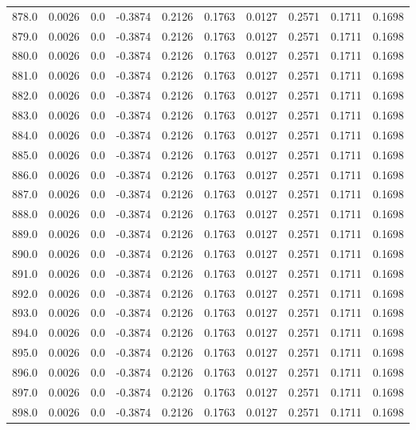 \begin{longtable}{lrrrrrrrrr}
878.0 & 0.0026 & 0.0 & -0.3874 & 0.2126 & 0.1763 & 0.0127 & 0.2571 & 0.1711 & 0.1698 \\
879.0 & 0.0026 & 0.0 & -0.3874 & 0.2126 & 0.1763 & 0.0127 & 0.2571 & 0.1711 & 0.1698 \\
880.0 & 0.0026 & 0.0 & -0.3874 & 0.2126 & 0.1763 & 0.0127 & 0.2571 & 0.1711 & 0.1698 \\
881.0 & 0.0026 & 0.0 & -0.3874 & 0.2126 & 0.1763 & 0.0127 & 0.2571 & 0.1711 & 0.1698 \\
882.0 & 0.0026 & 0.0 & -0.3874 & 0.2126 & 0.1763 & 0.0127 & 0.2571 & 0.1711 & 0.1698 \\
883.0 & 0.0026 & 0.0 & -0.3874 & 0.2126 & 0.1763 & 0.0127 & 0.2571 & 0.1711 & 0.1698 \\
884.0 & 0.0026 & 0.0 & -0.3874 & 0.2126 & 0.1763 & 0.0127 & 0.2571 & 0.1711 & 0.1698 \\
885.0 & 0.0026 & 0.0 & -0.3874 & 0.2126 & 0.1763 & 0.0127 & 0.2571 & 0.1711 & 0.1698 \\
886.0 & 0.0026 & 0.0 & -0.3874 & 0.2126 & 0.1763 & 0.0127 & 0.2571 & 0.1711 & 0.1698 \\
887.0 & 0.0026 & 0.0 & -0.3874 & 0.2126 & 0.1763 & 0.0127 & 0.2571 & 0.1711 & 0.1698 \\
888.0 & 0.0026 & 0.0 & -0.3874 & 0.2126 & 0.1763 & 0.0127 & 0.2571 & 0.1711 & 0.1698 \\
889.0 & 0.0026 & 0.0 & -0.3874 & 0.2126 & 0.1763 & 0.0127 & 0.2571 & 0.1711 & 0.1698 \\
890.0 & 0.0026 & 0.0 & -0.3874 & 0.2126 & 0.1763 & 0.0127 & 0.2571 & 0.1711 & 0.1698 \\
891.0 & 0.0026 & 0.0 & -0.3874 & 0.2126 & 0.1763 & 0.0127 & 0.2571 & 0.1711 & 0.1698 \\
892.0 & 0.0026 & 0.0 & -0.3874 & 0.2126 & 0.1763 & 0.0127 & 0.2571 & 0.1711 & 0.1698 \\
893.0 & 0.0026 & 0.0 & -0.3874 & 0.2126 & 0.1763 & 0.0127 & 0.2571 & 0.1711 & 0.1698 \\
894.0 & 0.0026 & 0.0 & -0.3874 & 0.2126 & 0.1763 & 0.0127 & 0.2571 & 0.1711 & 0.1698 \\
895.0 & 0.0026 & 0.0 & -0.3874 & 0.2126 & 0.1763 & 0.0127 & 0.2571 & 0.1711 & 0.1698 \\
896.0 & 0.0026 & 0.0 & -0.3874 & 0.2126 & 0.1763 & 0.0127 & 0.2571 & 0.1711 & 0.1698 \\
897.0 & 0.0026 & 0.0 & -0.3874 & 0.2126 & 0.1763 & 0.0127 & 0.2571 & 0.1711 & 0.1698 \\
898.0 & 0.0026 & 0.0 & -0.3874 & 0.2126 & 0.1763 & 0.0127 & 0.2571 & 0.1711 & 0.1698 \\

\end{longtable}
